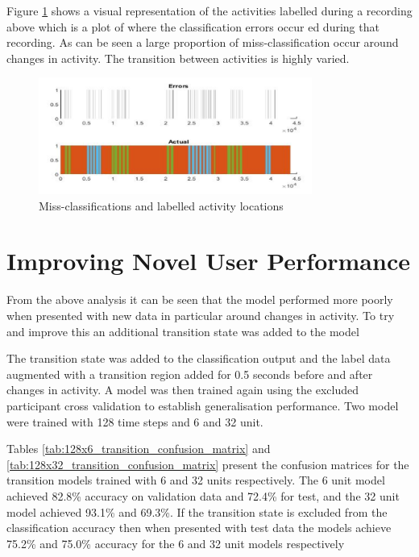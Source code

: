 \documentclass[sensors,article,submit,moreauthors,pdftex]{Definitions/mdpi}
\begin{document}

Figure \ref{fig:missclassification} shows a visual representation of the activities labelled during a recording above which is a plot of where the classification errors occur ed during that recording. As can be seen a large proportion of miss-classification occur around changes in activity. The transition between activities is highly varied.

\begin{figure}[!htb]
    \centering
    \includegraphics[width=0.8\textwidth]{Figures/results/Screenshot 2020-12-02 130339.png}
    \caption{Miss-classifications and labelled activity locations}
    \label{fig:missclassification}
\end{figure}

\section{Improving Novel User Performance}
From the above analysis it can be seen that the model performed more poorly when presented with new data in particular around changes in activity. To try and improve this an additional transition state was added to the model

The transition state was added to the classification output and the label data augmented with a transition region added for 0.5 seconds before and after changes in activity. A model was then trained again using the excluded participant cross validation to establish generalisation performance. Two model were trained with 128 time steps and 6 and 32 unit.

Tables \ref{tab:128x6_transition_confusion_matrix} and \ref{tab:128x32_transition_confusion_matrix} present the confusion matrices for the transition models trained with 6 and 32 units respectively. The 6 unit model achieved 82.8\% accuracy on validation data and 72.4\% for test, and the 32 unit model achieved 93.1\% and 69.3\%. If the transition state is excluded from the classification accuracy then when presented with test data the models achieve 75.2\% and 75.0\% accuracy for the 6 and 32 unit models respectively
\end{document}
